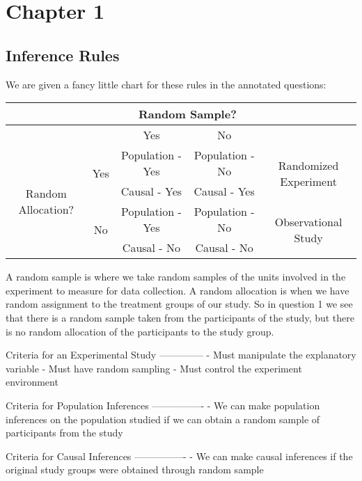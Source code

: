 \documentclass{article}
\title{\titletext}
\author{\authortext}
\theoremstyle{plain}
\theoremstyle{definition}
\theoremstyle{definition}
\begin{document}
\section{Chapter 1}
\subsection{Inference Rules}
We are given a fancy little chart for these rules in the annotated questions:\\
\begin{tabular}{|c|c|c|c|c|}
                        \hline&&\multicolumn{2}{c|}{Random Sample?}&\\
                        \hline&& Yes & No &\\
    \hline\multirow{4}{*}{Random Allocation?}&\multirow{2}{*}{Yes}&Population - Yes & Population - No & \multirow{2}{*}{Randomized Experiment}\\
    && Causal - Yes & Causal - Yes&\\
    &\multirow{2}{*}{No}&Population - Yes & Population - No & \multirow{2}{*}{Observational Study}\\
    &&Causal - No & Causal - No&\\
    \hline
\end{tabular}
A random sample is where we take random samples of the units involved in the experiment to measure for data collection. A random allocation is when we have random assignment to the treatment groups of our study. So in question 1 we see that there is a random sample taken from the participants of the study, but there is no random allocation of the participants to the study group.
\begin{markdown}
Criteria for an Experimental Study
--------------
- Must manipulate the explanatory variable
- Must have random sampling
- Must control the experiment environment

Criteria for Population Inferences
----------------
- We can make population inferences on the population studied if we can obtain a random sample of participants from the study

Criteria for Causal Inferences
----------------
- We can make causal inferences if the original study groups were obtained through random sample

\end{markdown}
\end{document}
